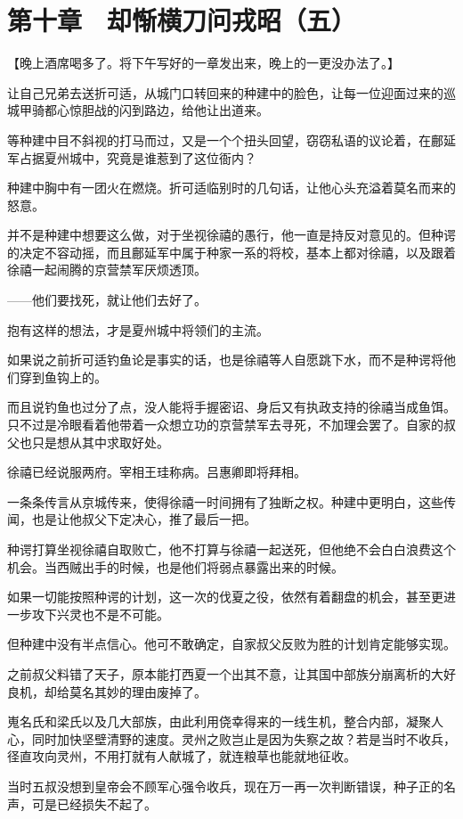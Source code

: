 \section{第十章　却惭横刀问戎昭（五）}

【晚上酒席喝多了。将下午写好的一章发出来，晚上的一更没办法了。】

让自己兄弟去送折可适，从城门口转回来的种建中的脸色，让每一位迎面过来的巡城甲骑都心惊胆战的闪到路边，给他让出道来。

等种建中目不斜视的打马而过，又是一个个扭头回望，窃窃私语的议论着，在鄜延军占据夏州城中，究竟是谁惹到了这位衙内？

种建中胸中有一团火在燃烧。折可适临别时的几句话，让他心头充溢着莫名而来的怒意。

并不是种建中想要这么做，对于坐视徐禧的愚行，他一直是持反对意见的。但种谔的决定不容动摇，而且鄜延军中属于种家一系的将校，基本上都对徐禧，以及跟着徐禧一起闹腾的京营禁军厌烦透顶。

——他们要找死，就让他们去好了。

抱有这样的想法，才是夏州城中将领们的主流。

如果说之前折可适钓鱼论是事实的话，也是徐禧等人自愿跳下水，而不是种谔将他们穿到鱼钩上的。

而且说钓鱼也过分了点，没人能将手握密诏、身后又有执政支持的徐禧当成鱼饵。只不过是冷眼看着他带着一众想立功的京营禁军去寻死，不加理会罢了。自家的叔父也只是想从其中求取好处。

徐禧已经说服两府。宰相王珪称病。吕惠卿即将拜相。

一条条传言从京城传来，使得徐禧一时间拥有了独断之权。种建中更明白，这些传闻，也是让他叔父下定决心，推了最后一把。

种谔打算坐视徐禧自取败亡，他不打算与徐禧一起送死，但他绝不会白白浪费这个机会。当西贼出手的时候，也是他们将弱点暴露出来的时候。

如果一切能按照种谔的计划，这一次的伐夏之役，依然有着翻盘的机会，甚至更进一步攻下兴灵也不是不可能。

但种建中没有半点信心。他可不敢确定，自家叔父反败为胜的计划肯定能够实现。

之前叔父料错了天子，原本能打西夏一个出其不意，让其国中部族分崩离析的大好良机，却给莫名其妙的理由废掉了。

嵬名氏和梁氏以及几大部族，由此利用侥幸得来的一线生机，整合内部，凝聚人心，同时加快坚壁清野的速度。灵州之败岂止是因为失察之故？若是当时不收兵，径直攻向灵州，不用打就有人献城了，就连粮草也能就地征收。

当时五叔没想到皇帝会不顾军心强令收兵，现在万一再一次判断错误，种子正的名声，可是已经损失不起了。

